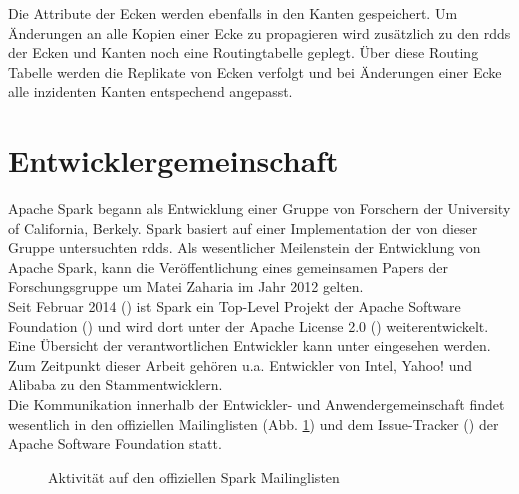 Die Attribute der Ecken werden ebenfalls in den Kanten gespeichert. Um Änderungen an alle Kopien einer Ecke zu propagieren wird zusätzlich zu den \glspl{rdd} der Ecken und Kanten noch eine Routingtabelle geplegt. Über diese Routing Tabelle werden die Replikate von Ecken verfolgt und bei Änderungen einer Ecke alle inzidenten Kanten entspechend angepasst.\\

\section{Entwicklergemeinschaft}

Apache Spark begann als Entwicklung einer Gruppe von Forschern der University of California, Berkely. Spark basiert auf einer Implementation der von dieser Gruppe untersuchten \glspl{rdd}\cite{Mat12}. Als wesentlicher Meilenstein der Entwicklung von Apache Spark, kann die Veröffentlichung eines gemeinsamen Papers der Forschungsgruppe um Matei Zaharia im Jahr 2012 gelten.\\

Seit Februar 2014 (\cite{apacheblog}) ist Spark ein Top-Level Projekt der Apache Software Foundation (\cite{apache}) und wird dort unter der Apache License 2.0 (\cite{apachelic}) weiterentwickelt.\\

Eine Übersicht der verantwortlichen Entwickler kann unter \cite{committer} eingesehen werden.
Zum Zeitpunkt dieser Arbeit gehören u.a. Entwickler von Intel, Yahoo! und Alibaba zu den Stammentwicklern.\\

Die Kommunikation innerhalb der Entwickler- und Anwendergemeinschaft findet wesentlich in den offiziellen Mailinglisten (Abb. \ref{fig:mailinglisten}) und dem Issue-Tracker (\cite{issuetracker}) der Apache Software Foundation statt.

\begin{figure}[ht!]
	\centering
	\caption{Aktivität auf den offiziellen Spark Mailinglisten}
	\label{fig:mailinglisten}
\end{figure}
\\

